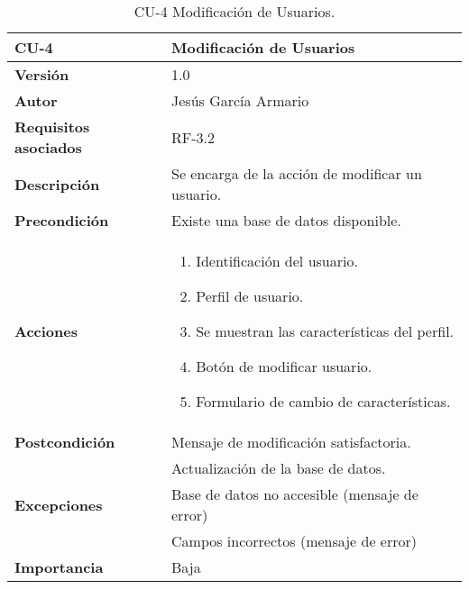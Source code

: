 \begin{table}[p]
	\centering
	\begin{tabularx}{\linewidth}{ p{} p{} }
		\toprule
		\textbf{CU-4}    & \textbf{Modificación de Usuarios}\\
		\toprule
		\textbf{Versión}              & 1.0    \\
		\textbf{Autor}                & Jesús García Armario \\
		\textbf{Requisitos asociados} & RF-3.2 \\
		\textbf{Descripción}          & Se encarga de la acción de modificar un usuario. \\
		\textbf{Precondición}         & Existe una base de datos disponible. \\
		\textbf{Acciones}             &
		\begin{enumerate}
			\def\labelenumi{\arabic{enumi}.}
			\tightlist
			\item Identificación del usuario.
   \item Perfil de usuario.
   \item Se muestran las características del perfil.
   \item Botón de modificar usuario.
   \item Formulario de cambio de características.
\end{enumerate}\\
		\textbf{Postcondición}        &  Mensaje de modificación satisfactoria. \\
  & Actualización de la base de datos.\\
		\textbf{Excepciones}          & Base de datos no accesible (mensaje de error)\\
  & Campos incorrectos (mensaje de error)\\
		\textbf{Importancia}          & Baja \\
		\bottomrule
	\end{tabularx}
	\caption{CU-4 Modificación de Usuarios.}
 \end{table}

